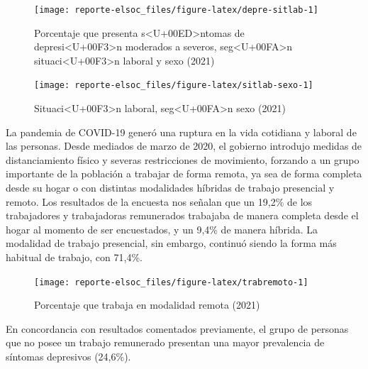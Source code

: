 \documentclass[
  12pt,
]{book}
\begin{document}
\begin{figure}

{\centering \texttt{[image: reporte-elsoc\_files/figure-latex/depre-sitlab-1]} 

}

\caption{Porcentaje que presenta s<U+00ED>ntomas de depresi<U+00F3>n moderados a severos, seg<U+00FA>n situaci<U+00F3>n laboral y sexo (2021)}\label{fig:depre-sitlab}
\end{figure}

\begin{figure}

{\centering \texttt{[image: reporte-elsoc\_files/figure-latex/sitlab-sexo-1]} 

}

\caption{Situaci<U+00F3>n laboral, seg<U+00FA>n sexo (2021)}\label{fig:sitlab-sexo}
\end{figure}

La pandemia de COVID-19 generó una ruptura en la vida cotidiana y laboral de las personas. Desde mediados de marzo de 2020, el gobierno introdujo medidas de distanciamiento físico y severas restricciones de movimiento, forzando a un grupo importante de la población a trabajar de forma remota, ya sea de forma completa desde su hogar o con distintas modalidades híbridas de trabajo presencial y remoto. Los resultados de la encuesta nos señalan que un 19,2\% de los trabajadores y trabajadoras remunerados trabajaba de manera completa desde el hogar al momento de ser encuestados, y un 9,4\% de manera híbrida. La modalidad de trabajo presencial, sin embargo, continuó siendo la forma más habitual de trabajo, con 71,4\%.

\begin{figure}

{\centering \texttt{[image: reporte-elsoc\_files/figure-latex/trabremoto-1]} 

}

\caption{Porcentaje que trabaja en modalidad remota (2021)}\label{fig:trabremoto}
\end{figure}

En concordancia con resultados comentados previamente, el grupo de personas que no posee un trabajo remunerado presentan una mayor prevalencia de síntomas depresivos (24,6\%).
\end{document}
